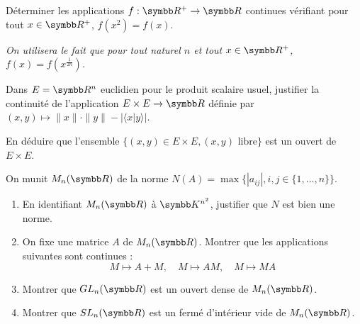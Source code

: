 \begin{exercice}
    Déterminer les applications $f: \R^{+} \rightarrow \R$ continues vérifiant pour tout $x \in \R^{+}$, $f(x^{2})=f(x)$.
    
    \textit{On utilisera le fait que pour tout naturel $n$ et tout $x \in \R^{+}$, $f(x) = f\left(x^{\frac{1}{2n}}\right)$.}
\end{exercice}

\begin{exercice}
    Dans $E=\R^{n}$ euclidien pour le produit scalaire usuel, justifier la continuité de l'application $E \times E \rightarrow \R$ 
    définie par $(x,y) \mapsto \|x\| \cdot \|y\| - |\langle x | y \rangle|$.

    En déduire que l'ensemble $\{(x,y) \in E \times E, (x,y) \text{ libre}\}$ est un ouvert de $E \times E$.
\end{exercice}

\begin{exercice}
    On munit $M_{n}(\R)$ de la norme $N(A) = \max \{|a_{ij}|, i,j \in \{1,\dots,n\}\}$.
    \begin{enumerate}
        \item En identifiant $M_{n}(\R)$ à $\K^{n^{2}}$, justifier que $N$ est bien une norme.
        \item On fixe une matrice $A$ de $M_{n}(\R)$. Montrer que les applications suivantes sont continues :
            \[M \mapsto A+M, \quad M \mapsto AM, \quad M \mapsto MA\]
        \item Montrer que $GL_{n}(\R)$ est un ouvert dense de $M_{n}(\R)$.
        \item Montrer que $SL_{n}(\R)$ est un fermé d'intérieur vide de $M_{n}(\R)$.
    \end{enumerate}
\end{exercice}

